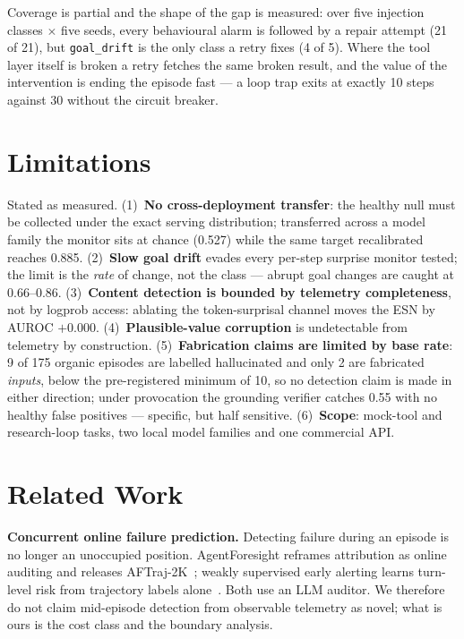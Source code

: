 \documentclass{article}
\begin{document}
Coverage is partial and the shape of the gap is measured: over five injection
classes $\times$ five seeds, every behavioural alarm is followed by a repair
attempt (21 of 21), but \texttt{goal\_drift} is the only class a retry fixes (4
of 5). Where the tool layer itself is broken a retry fetches the same broken
result, and the value of the intervention is ending the episode fast --- a loop
trap exits at exactly 10 steps against 30 without the circuit breaker.

\section{Limitations}
\label{sec:limits}

Stated as measured. (1)~\textbf{No cross-deployment transfer}: the healthy null
must be collected under the exact serving distribution; transferred across a
model family the monitor sits at chance (0.527) while the same target
recalibrated reaches 0.885. (2)~\textbf{Slow goal drift} evades every per-step
surprise monitor tested; the limit is the \emph{rate} of change, not the class
--- abrupt goal changes are caught at 0.66--0.86. (3)~\textbf{Content detection
is bounded by telemetry completeness}, not by logprob access: ablating the
token-surprisal channel moves the ESN by AUROC $+0.000$. (4)~\textbf{Plausible-value
corruption} is undetectable from telemetry by construction. (5)~\textbf{Fabrication
claims are limited by base rate}: 9 of 175 organic episodes are labelled
hallucinated and only 2 are fabricated \emph{inputs}, below the pre-registered
minimum of 10, so no detection claim is made in either direction; under
provocation the grounding verifier catches 0.55 with no healthy false positives
--- specific, but half sensitive. (6)~\textbf{Scope}: mock-tool and research-loop
tasks, two local model families and one commercial API.

\section{Related Work}

\textbf{Concurrent online failure prediction.} Detecting failure during an
episode is no longer an unoccupied position. AgentForesight reframes attribution
as online auditing and releases AFTraj-2K~\cite{zhang2026agentforesight};
weakly supervised early alerting learns turn-level risk from trajectory labels
alone~\cite{baidya2026sparse}. Both use an LLM auditor. We therefore do not
claim mid-episode detection from observable telemetry as novel; what is ours is
the cost class and the boundary analysis.
\end{document}
